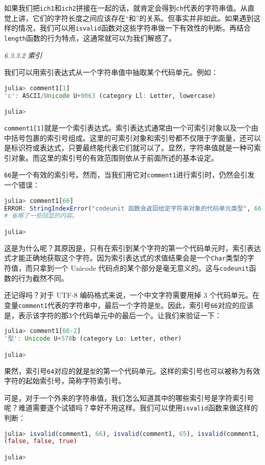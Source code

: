如果我们把\verb`ich1`和\verb`ich2`拼接在一起的话，就肯定会得到\verb`ch`代表的字符串值。从直觉上讲，它们的字符长度之间应该存在“和”的关系。但事实并非如此。如果遇到这样的情况，我们可以用\verb`isvalid`函数对这些字符串做一下有效性的判断。再结合\verb`length`函数的行为特点，这通常就可以为我们解惑了。

\textsl{6.3.3.2 索引}

我们可以用索引表达式从一个字符串值中抽取某个代码单元。例如：
\begin{lstlisting}[language=julia]
julia> comment1[1]
'c': ASCII/Unicode U+0063 (category Ll: Letter, lowercase)

julia> 
\end{lstlisting}

\verb`comment1[1]`就是一个索引表达式。索引表达式通常由一个可索引对象以及一个由中括号包裹的索引号组成。这里的可索引对象和索引号都不仅限于字面量，还可以是标识符或表达式，只要最终能代表它们就可以了。显然，字符串值就是一种可索引对象。而这里的索引号的有效范围则依从于前面所述的基本设定。

\verb`66`是一个有效的索引号。然而，当我们用它对\verb`comment1`进行索引时，仍然会引发一个错误：
\begin{lstlisting}[language=julia]
julia> comment1[66]
ERROR: StringIndexError("codeunit 函数会返回给定字符串对象的代码单元类型", 66)
# 省略了一些回显的内容。

julia> 
\end{lstlisting}

这是为什么呢？其原因是，只有在索引到某个字符的第一个代码单元时，索引表达式才能正确地获取这个字符。因为索引表达式的求值结果会是一个\verb`Char`类型的字符值，而只拿到一个 Unicode 代码点的某个部分是毫无意义的。这与\verb`codeunit`函数的行为截然不同。

还记得吗？对于 UTF-8 编码格式来说，一个中文字符需要用掉 3 个代码单元。在变量\verb`comment1`代表的字符串中，最后一个字符是\verb`型`。因此，索引号\verb`66`对应的应该是，表示该字符的那3个代码单元中的最后一个。让我们来验证一下：
\begin{lstlisting}[language=julia]
julia> comment1[66-2]
'型': Unicode U+578b (category Lo: Letter, other)

julia> 
\end{lstlisting}

果然，索引号\verb`64`对应的就是\verb`型`的第一个代码单元。这样的索引号也可以被称为有效字符的起始索引号，简称字符索引号。

可是，对于一个外来的字符串值，我们怎么知道其中的哪些索引号是字符索引号呢？难道需要逐个试错吗？幸好不用这样。我们可以使用\verb`isvalid`函数来做这样的判断：
\begin{lstlisting}[language=julia]
julia> isvalid(comment1, 66), isvalid(comment1, 65), isvalid(comment1, 64)
(false, false, true)

julia> 
\end{lstlisting}

